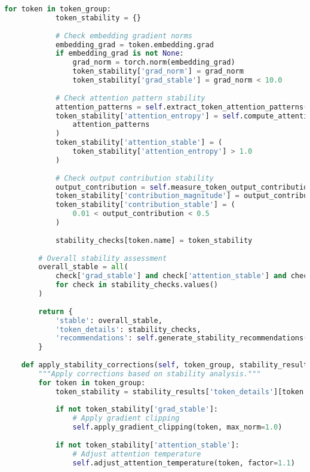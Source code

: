\begin{lstlisting}[language=Python, caption=Progressive custom token integration]
        for token in token_group:
            token_stability = {}
            
            # Check embedding gradient norms
            embedding_grad = token.embedding.grad
            if embedding_grad is not None:
                grad_norm = torch.norm(embedding_grad)
                token_stability['grad_norm'] = grad_norm
                token_stability['grad_stable'] = grad_norm < 10.0
            
            # Check attention pattern stability
            attention_patterns = self.extract_token_attention_patterns(token)
            token_stability['attention_entropy'] = self.compute_attention_entropy(
                attention_patterns
            )
            token_stability['attention_stable'] = (
                token_stability['attention_entropy'] > 1.0
            )
            
            # Check output contribution stability
            output_contribution = self.measure_token_output_contribution(token)
            token_stability['contribution_magnitude'] = output_contribution
            token_stability['contribution_stable'] = (
                0.01 < output_contribution < 0.5
            )
            
            stability_checks[token.name] = token_stability
        
        # Overall stability assessment
        overall_stable = all(
            check['grad_stable'] and check['attention_stable'] and check['contribution_stable']
            for check in stability_checks.values()
        )
        
        return {
            'stable': overall_stable,
            'token_details': stability_checks,
            'recommendations': self.generate_stability_recommendations(stability_checks)
        }
    
    def apply_stability_corrections(self, token_group, stability_results):
        """Apply corrections based on stability analysis."""
        for token in token_group:
            token_stability = stability_results['token_details'][token.name]
            
            if not token_stability['grad_stable']:
                # Apply gradient clipping
                self.apply_gradient_clipping(token, max_norm=1.0)
            
            if not token_stability['attention_stable']:
                # Adjust attention temperature
                self.adjust_attention_temperature(token, factor=1.1)
            

\end{lstlisting}
